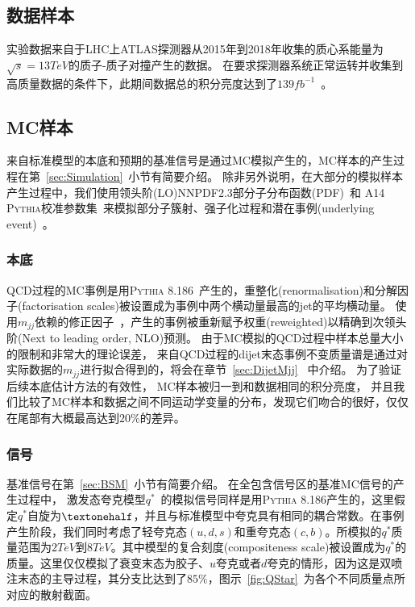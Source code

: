 \subsection{数据样本}
\label{sec:DijetDataS}
实验数据来自于LHC上ATLAS探测器从2015年到2018年收集的质心系能量为$\sqrt{s}=13TeV$的质子-质子对撞产生的数据。
在要求探测器系统正常运转并收集到高质量数据的条件下，此期间数据总的积分亮度达到了$139fb^{-1}$~\cite{ATLASWEB1}。

\subsection{MC样本}
\label{sec:DijetMCS}

来自标准模型的本底和预期的基准信号是通过MC模拟产生的，MC样本的产生过程在第~\ref{sec:Simulation}~小节有简要介绍。
除非另外说明，在大部分的模拟样本产生过程中，我们使用领头阶(LO)NNPDF2.3部分子分布函数(PDF)~\cite{Ball:2012cx}和
A14 \textsc{Pythia}校准参数集~\cite{ATL-PHYS-PUB-2014-021}来模拟部分子簇射、强子化过程和潜在事例(underlying event)~\cite{MC3}。

\subsubsection{本底}
\label{sec:DijetMCQCD}
QCD过程的MC事例是用\textsc{Pythia 8.186}~\cite{Sjostrand:2007gs}产生的，重整化(renormalisation)和分解因子(factorisation scales)被设置成为事例中两个横动量最高的jet的平均横动量。
使用$m_{jj}$依赖的修正因子~\cite{Nagy:2001fj,Nagy:2003tz,Catani:1996vz}，产生的事例被重新赋予权重(reweighted)以精确到次领头阶(Next to leading order, NLO)预测。
由于MC模拟的QCD过程中样本总量大小的限制和非常大的理论误差，    
来自QCD过程的dijet末态事例不变质量谱是通过对实际数据的$m_{jj}$进行拟合得到的，将会在章节~\ref{sec:DijetMjj}~ 中介绍。
为了验证后续本底估计方法的有效性，
MC样本被归一到和数据相同的积分亮度，
并且我们比较了MC样本和数据之间不同运动学变量的分布，发现它们吻合的很好，仅仅在尾部有大概最高达到$20\%$的差异。

\subsubsection{信号}
\label{sec:DijetMCSignal}
基准信号在第~\ref{sec:BSM}~小节有简要介绍。
在全包含信号区的基准MC信号的产生过程中，
激发态夸克模型$q^*$~\cite{qstar1,qstar2}的模拟信号同样是用\textsc{Pythia 8.186}产生的，这里假定$q^*$自旋为$\textonehalf$，并且与标准模型中夸克具有相同的耦合常数。在事例产生阶段，我们同时考虑了轻夸克态$(u,d,s)$和重夸克态$(c,b)$。所模拟的$q^*$质量范围为$2TeV$到$8TeV$。其中模型的复合刻度(compositeness scale)被设置成为$q^*$的质量。这里仅仅模拟了衰变末态为胶子、$u$夸克或者$d$夸克的情形，因为这是双喷注末态的主导过程，其分支比达到了$85\%$，图示~\ref{fig:QStar}~为各个不同质量点所对应的散射截面。

